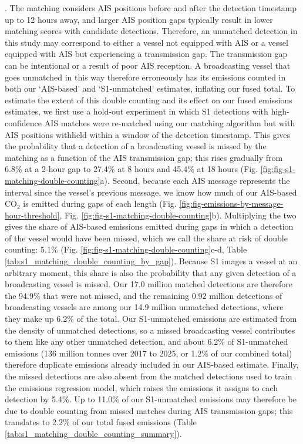 \documentclass[lineno,pdflatex,sn-nature]{sn-jnl}
\begin{document}
{. The matching considers AIS positions before and after the detection timestamp up to 12 hours away, and larger AIS position gaps typically result in lower matching scores with candidate detections. Therefore, an unmatched detection in this study may correspond to either a vessel not equipped with AIS or a vessel equipped with AIS but experiencing a transmission gap. The transmission gap can be intentional or a result of poor AIS reception. A broadcasting vessel that goes unmatched in this way therefore erroneously has its emissions counted in both our `AIS-based' and `S1-unmatched' estimates, inflating our fused total. To estimate the extent of this double counting and its effect on our fused emissions estimates, we first use a hold-out experiment in which S1 detections with high-confidence AIS matches were re-matched using our matching algorithm but with AIS positions withheld within a window of the detection timestamp. This gives the probability that a detection of a broadcasting vessel is missed by the matching as a function of the AIS transmission gap; this rises gradually from 6.8\% at a 2-hour gap to 27.4\% at 8 hours and 45.4\% at 18 hours (Fig. \ref{fig:fig-s1-matching-double-counting}a). Second, because each AIS message represents the interval since the vessel's previous message, we know how much of our AIS-based CO$_{2}$ is emitted during gaps of each length (Fig. \ref{fig:fig-emissions-by-message-hour-threshold}, Fig. \ref{fig:fig-s1-matching-double-counting}b). Multiplying the two gives the share of AIS-based emissions emitted during gaps in which a detection of the vessel would have been missed, which we call the share at risk of double counting: 5.1\% (Fig. \ref{fig:fig-s1-matching-double-counting}c-d, Table \ref{tab:s1_matching_double_counting_by_gap}). Because S1 images a vessel at an arbitrary moment, this share is also the probability that any given detection of a broadcasting vessel is missed. Our 17.0 million matched detections are therefore the 94.9\% that were not missed, and the remaining 0.92 million detections of broadcasting vessels are among our 14.9 million unmatched detections, where they make up 6.2\% of the total. Our S1-unmatched emissions are estimated from the density of unmatched detections, so a missed broadcasting vessel contributes to them like any other unmatched detection, and about 6.2\% of S1-unmatched emissions (136 million tonnes over 2017 to 2025, or 1.2\% of our combined total) therefore duplicate emissions already included in our AIS-based estimate. Finally, the missed detections are also absent from the matched detections used to train the emissions regression model, which raises the emissions it assigns to each detection by 5.4\%. Up to 11.0\% of our S1-unmatched emissions may therefore be due to double counting from missed matches during AIS transmission gaps; this translates to 2.2\% of our total fused emissions (Table \ref{tab:s1_matching_double_counting_summary}). 
}
\end{document}
